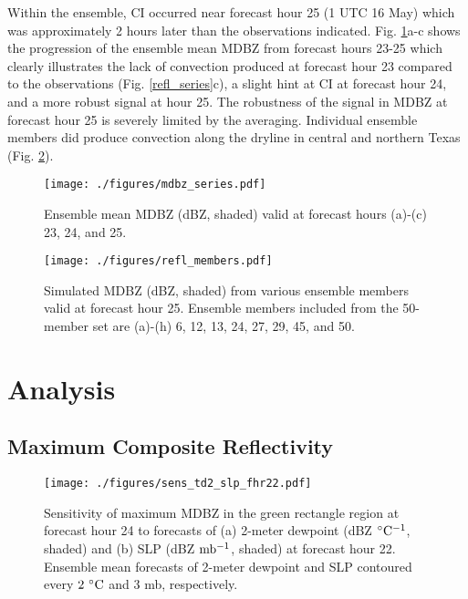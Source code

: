 \documentclass{ttuthes2007}
\newcommand{\tab}{\hspace*{2em}}  %
\begin{document}
\tab Within the ensemble, CI occurred near forecast hour 25 (1 UTC 16 May) which was approximately 2 hours later than the observations indicated. Fig. \ref{mdbz_series}a-c shows the progression of the ensemble mean MDBZ from forecast hours 23-25 which clearly illustrates the lack of convection produced at forecast hour 23 compared to the observations (Fig. \ref{refl_series}c), a slight hint at CI at forecast hour 24, and a more robust signal at hour 25. The robustness of the signal in MDBZ at forecast hour 25 is severely limited by the averaging. Individual ensemble members did produce convection along the dryline in central and northern Texas (Fig. \ref{refl_members}). 

\begin{figure}[!tb]
  \centering
  \noindent\texttt{[image: ./figures/mdbz\_series.pdf]}\\
  \caption{Ensemble mean MDBZ (dBZ, shaded) valid at forecast hours (a)-(c) 23, 24, and 25.}
\label{mdbz_series}
\end{figure}

\begin{figure}[!tb]
  \centering
  \noindent\texttt{[image: ./figures/refl\_members.pdf]}\\
  \caption{Simulated MDBZ (dBZ, shaded) from various ensemble members valid at forecast hour 25. Ensemble members included from the 50-member set are (a)-(h) 6, 12, 13, 24, 27, 29, 45, and 50. }
\label{refl_members}
\end{figure}

\section{Analysis}

\subsection{Maximum Composite Reflectivity}

\begin{figure}[!bt]
  \centering
  \noindent\texttt{[image: ./figures/sens\_td2\_slp\_fhr22.pdf]}\\
  \caption{Sensitivity of maximum MDBZ in the green rectangle region at forecast hour 24 to forecasts of (a) 2-meter dewpoint (dBZ ${}^{\circ} {\rm C^{-1}}$, shaded) and (b) SLP (dBZ $ {\rm mb^{-1}}$, shaded) at forecast hour 22. Ensemble mean forecasts of 2-meter dewpoint and SLP contoured every $2^{~\circ} {\rm C}$ and 3 mb, respectively.}
\label{sens_td2_slp_fhr22}
\end{figure}
\end{document}
